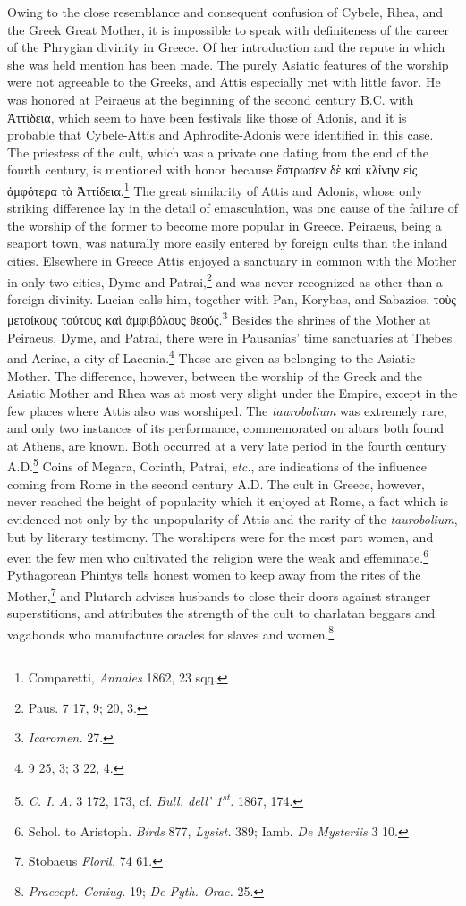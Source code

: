 \documentclass[a4paper, 11pt, oneside, polutonikogreek, english]{article}
\begin{document}
Owing to the close resemblance and consequent confusion of Cybele, Rhea, and the Greek Great Mother, it is impossible to speak with definiteness of the career of the Phrygian divinity in Greece. Of her introduction and the repute in which she was held mention has been made. The purely Asiatic features of the worship were not agreeable to the Greeks, and Attis especially met with little favor. He was honored at Peiraeus at the beginning of the second century \textsc{B.C.} with Ἀττίδεια, which seem to have been festivals like those of Adonis, and it is probable that Cybele-Attis and Aphrodite-Adonis were identified in this case. The priestess of the cult, which was a private one dating from the end of the fourth century, is mentioned with honor because ἔστρωσεν δὲ καὶ κλίνην εἰς ἀμφότερα τὰ Ἀττίδεια.\footnote{Comparetti, \emph{Annales} 1862, 23 sqq.} The great similarity of Attis and Adonis, whose only striking difference lay in the detail of emasculation, was one cause of the failure of the worship of the former to become more popular in Greece. Peiraeus, being a seaport town, was naturally more easily entered by foreign cults than the inland cities. Elsewhere in Greece Attis enjoyed a sanctuary in common with the Mother in only two cities, Dyme and Patrai,\footnote{Paus. 7 17, 9; 20, 3.} and was never recognized as other than a foreign divinity. Lucian calls him, together with Pan, Korybas, and Sabazios, τοὺς μετοίκους τούτους καὶ ἀμφιβόλους θεούς.\footnote{\emph{Icaromen.} 27.} Besides the shrines of the Mother at Peiraeus, Dyme, and Patrai, there were in Pausanias' time sanctuaries at Thebes and Acriae, a city of Laconia.\footnote{9 25, 3; 3 22, 4.} These are given as belonging to the Asiatic Mother. The difference, however, between the worship of the Greek and the Asiatic Mother and Rhea was at most very slight under the Empire, except in the few places where Attis also was worshiped. The \emph{taurobolium} was extremely rare, and only two instances of its performance, commemorated on altars both found at Athens, are known. Both occurred at a very late period in the fourth century \textsc{A.D.}\footnote{\emph{C. I. A.} 3 172, 173, cf. \emph{Bull. dell' 1\textsuperscript{st}.} 1867, 174.} Coins of Megara, Corinth, Patrai, \emph{etc.}, are indications of the influence coming from Rome in the second century \textsc{A.D.} The cult in Greece, however, never reached the height of popularity which it enjoyed at Rome, a fact which is evidenced not only by the unpopularity of Attis and the rarity of the \emph{taurobolium}, but by literary testimony. The worshipers were for the most part women, and even the few men who cultivated the religion were the weak and effeminate.\footnote{Schol. to Aristoph. \emph{Birds} 877, \emph{Lysist.} 389; Iamb. \emph{De Mysteriis} 3 10.} Pythagorean Phintys tells honest women to keep away from the rites of the Mother,\footnote{Stobaeus \emph{Floril.} 74 61.} and Plutarch advises husbands to close their doors against stranger superstitions, and attributes the strength of the cult to charlatan beggars and vagabonds who manufacture oracles for slaves and women.\footnote{\emph{Praecept. Coniug.} 19; \emph{De Pyth. Orac.} 25.}
\end{document}
